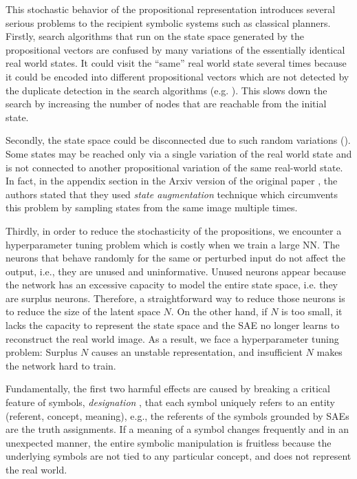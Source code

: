 This stochastic behavior of the propositional representation
introduces several serious problems to the recipient symbolic systems such as classical planners.
% 
Firstly,
search algorithms that run on the state space generated by the propositional vectors
are confused by many variations of the essentially identical real world states.
It could visit the ``same'' real world state several times because
it could be encoded into different propositional vectors
which are not detected by the duplicate detection in the search algorithms (e.g. \astar).
This slows down the search by increasing the number of nodes that are reachable from the initial state.

Secondly, the state space could be disconnected due to such random variations ().
Some states may be reached only via a single variation of the real world state and is not connected to
another propositional variation of the same real-world state.
In fact, in the appendix section in the Arxiv version of the original paper \cite{Asai2018},
the authors stated that they used \emph{state augmentation} technique
which circumvents this problem by sampling states from the same image multiple times.

Thirdly, in order to reduce the stochasticity of the propositions, we encounter a hyperparameter tuning problem
which is costly when we train a large NN.
% 
The neurons that behave randomly for the same or perturbed input do not affect the output,
i.e., they are unused and uninformative.
Unused neurons appear because the network has an excessive capacity to 
model the entire state space, i.e. they are surplus neurons.
Therefore, a straightforward way to reduce those neurons is to reduce the size of the latent space $N$.
On the other hand, if $N$ is too small, it lacks the capacity to represent the state space
and the SAE no longer learns to reconstruct the real world image.
As a result, we face a hyperparameter tuning problem: Surplus $N$ causes an unstable representation,
and insufficient $N$ makes the network hard to train.

Fundamentally,
the first two harmful effects are caused by breaking a critical feature of symbols, \emph{designation} \cite{newell1976computer,newell1980physical},
that each symbol uniquely refers to an entity (referent, concept, meaning),
e.g., the referents of the symbols grounded by SAEs are the truth assignments.
If a meaning of a symbol changes frequently and in an unexpected manner, the entire symbolic manipulation is fruitless
because the underlying symbols are not tied to any particular concept, and does not represent the real world.


